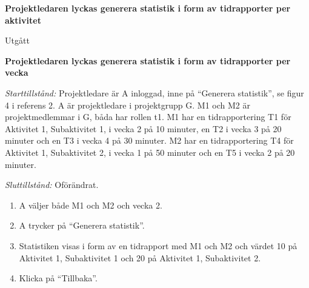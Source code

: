 \documentclass[a4paper]{article}
\begin{document}
\begin{FT}
\item
\textbf{Projektledaren lyckas generera statistik i form av tidrapporter per aktivitet}

Utgått





\item
\textbf{Projektledaren lyckas generera statistik i form av tidrapporter per vecka}

\emph{Starttillstånd:} Projektledare är A inloggad, inne på ``Generera statistik'', se figur 4 i referens 2. A är projektledare i projektgrupp G. M1 och M2 är projektmedlemmar i G, båda har rollen t1. M1 har en tidrapportering T1 för Aktivitet 1, Subaktivitet 1, i vecka 2 på 10 minuter, en T2 i vecka 3 på 20 minuter och en T3 i vecka 4 på 30 minuter. M2 har en tidrapportering T4 för Aktivitet 1, Subaktivitet 2, i vecka 1 på 50 minuter och en T5 i vecka 2 på 20 minuter.

\emph{Sluttillstånd:} Oförändrat.

\begin{enumerate}
\item A väljer både M1 och M2 och vecka 2.
\item A trycker på ``Generera statistik''.
\item Statistiken visas i form av en tidrapport med M1 och M2 och värdet 10 på Aktivitet 1, Subaktivitet 1 och 20 på Aktivitet 1, Subaktivitet 2.
\item Klicka på ``Tillbaka''.
\end{enumerate}



\end{FT}
\end{document}
